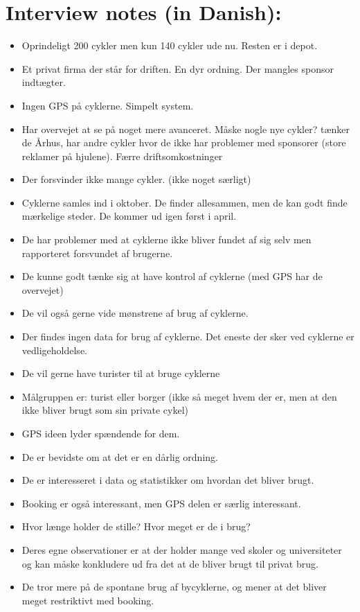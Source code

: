 \section{Interview notes (in Danish):}

\begin{itemize}
\item Oprindeligt 200 cykler men kun 140 cykler ude nu. Resten er i depot.
\item Et privat firma der står for driften. En dyr ordning. Der mangles sponsor indtægter.
\item Ingen GPS på cyklerne. Simpelt system.
\item Har overvejet at se på noget mere avanceret. Måske nogle nye cykler? tænker de
Århus, har andre cykler hvor de ikke har problemer med sponsorer (store reklamer på hjulene). Færre driftsomkostninger
\item Der forsvinder ikke mange cykler. (ikke noget særligt)
\item Cyklerne samles ind i oktober. De finder allesammen, men de kan godt finde mærkelige steder. De kommer ud igen først i april.
\item De har problemer med at cyklerne ikke bliver fundet af sig selv men rapporteret forsvundet af brugerne.
\item De kunne godt tænke sig at have kontrol af cyklerne (med GPS har de overvejet)
\item De vil også gerne vide mønstrene af brug af cyklerne.
\item Der findes ingen data for brug af cyklerne. Det eneste der sker ved cyklerne er vedligeholdelse.
\item De vil gerne have turister til at bruge cyklerne
\item Målgruppen er: turist eller borger (ikke så meget hvem der er, men at den ikke bliver brugt som sin private cykel)
\item GPS ideen lyder spændende for dem.
\item De er bevidste om at det er en dårlig ordning.
\item De er interesseret i data og statistikker om hvordan det bliver brugt.
\item Booking er også interessant, men GPS delen er særlig interessant.
\item Hvor længe holder de stille? Hvor meget er de i brug?
\item Deres egne observationer er at der holder mange ved skoler og universiteter og kan måske konkludere ud fra det at de bliver brugt til privat brug.
\item De tror mere på de spontane brug af bycyklerne, og mener at det bliver meget restriktivt med booking.
\end{itemize}